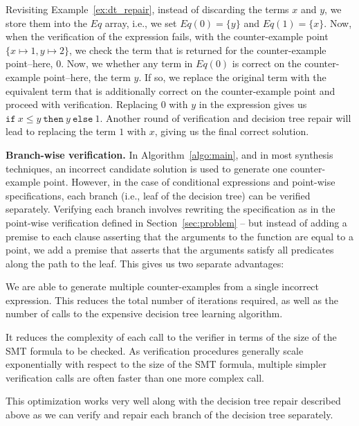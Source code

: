 \documentclass{llncs}
\newcommand\Equiv{\mathit{Eq}}
\renewcommand{\paragraph}[1]{\par\noindent\textbf{#1.}}
\begin{document}
\begin{example}
  Revisiting Example~\ref{ex:dt_repair}, instead of discarding the terms
  $x$ and $y$, we store them into the $\Equiv$ array, i.e., we set
  $\Equiv(0) = \{ y \}$ and $\Equiv(1) = \{ x \}$.
  Now, when the verification of the expression fails, with the
  counter-example point $\{ x \mapsto 1, y \mapsto 2 \}$, we check the
  term that is returned for the counter-example point--here, $0$.
  Now, we whether any term in $\Equiv(0)$ is correct on the
  counter-example point--here, the term $y$.
  If so, we replace the original term with the equivalent term that is
  additionally correct on the counter-example point and proceed with
  verification.
  Replacing $0$ with $y$ in the expression gives us $\mathtt{if}~x \leq
  y~\mathtt{then}~y~\mathtt{else}~1$.
  Another round of verification and decision tree repair will lead to
  replacing the term $1$ with $x$, giving us the final correct solution.
\end{example}

\paragraph{Branch-wise verification}
In Algorithm~\ref{algo:main}, and in most synthesis techniques, an
incorrect candidate solution is used to generate one counter-example
point.
However, in the case of conditional expressions and point-wise
specifications, each branch (i.e., leaf of the decision tree) can be
verified separately.
Verifying each branch involves rewriting the specification as in the
point-wise verification defined in Section~\ref{sec:problem} -- but
instead of adding a premise to each clause asserting that the arguments
to the function are equal to a point, we add a premise that asserts that
the arguments satisfy all predicates along the path to the leaf.
This gives us two separate advantages:
\begin{compactitem}
\item We are able to generate multiple counter-examples from a single
  incorrect expression.
  This reduces the total number of iterations required, as well as the
  number of calls to the expensive decision tree learning algorithm.
\item It reduces the complexity of each call to the verifier in terms of
  the size of the SMT formula to be checked.
  As verification procedures generally scale exponentially with respect
  to the size of the SMT formula, multiple simpler verification calls
  are often faster than one more complex call.
\end{compactitem}
This optimization works very well along with the decision tree repair
described above as we can verify and repair each branch of the decision
tree separately.
\end{document}
